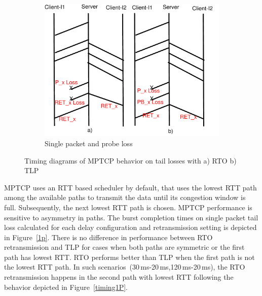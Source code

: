 \documentclass[10pt,conference]{IEEEtran}
\begin{document}
\begin{figure}[!tbp]
\begin{subfigure}[b]{0.32\textwidth}
  	\includegraphics[angle=0, width=\textwidth, natwidth=610, natheight=400]{images/timing1PP.pdf}
	\caption{Single packet and probe loss}\label{timing1PP}
 \end{subfigure}
 \caption{Timing diagrams of MPTCP behavior on tail losses with a) RTO b) TLP }\label{mptiming}	
\end{figure}


MPTCP uses an RTT based scheduler by default, that uses the lowest RTT path among the available paths to transmit the data until its congestion 
window is full. Subsequently, the next lowest RTT path is chosen. MPTCP performance is sensitive to asymmetry in paths. The burst completion times 
on single packet tail loss calculated for each delay configuration and retransmission setting is depicted in Figure~\ref{1p}. There is no 
difference in performance between RTO retransmission and TLP for cases when both paths are symmetric or the first path has lowest RTT. RTO performs 
better than TLP when the first path is not the lowest RTT path. In such scenarios~(30\,ms-20\,ms,120\,ms-20\,ms), the RTO retransmission happens 
in the second path with lowest RTT following the behavior depicted in Figure~\ref{timing1P}.
\end{document}
